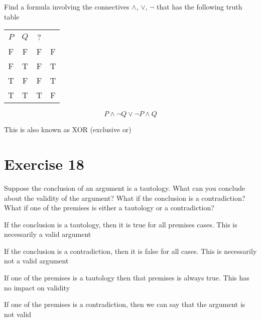 \documentclass[11pt]{article}
\begin{document}
Find a formula involving the connectives $\wedge$, $\vee$, $\neg$ that has the following truth table

\begin{center}
\begin{tabular}{ c c c c }
 $P$ & $Q$ & ?\\ 
F & F & F & F\\  
F & T & F & T\\
T & F & F & T\\  
T & T & T & F
\end{tabular}
\end{center}

$$P \wedge \neg Q \vee \neg P \wedge Q$$

This is also known as XOR (exclusive or)

\section*{Exercise 18}

Suppose the conclusion of an argument is a tautology. What can you
conclude about the validity of the argument? What if the conclusion is
a contradiction? What if one of the premises is either a tautology or a
contradiction?

If the conclusion is a tautology, then it is true for all premises cases. 
This is necessarily a valid argument

If the conclusion is a contradiction, then it is false for all cases.
This is necessarily not a valid argument

If one of the premises is a tautology then that premises is always true.
This has no impact on validity

If one of the premises is a contradiction, then we can say that the argument is not valid
\end{document}
